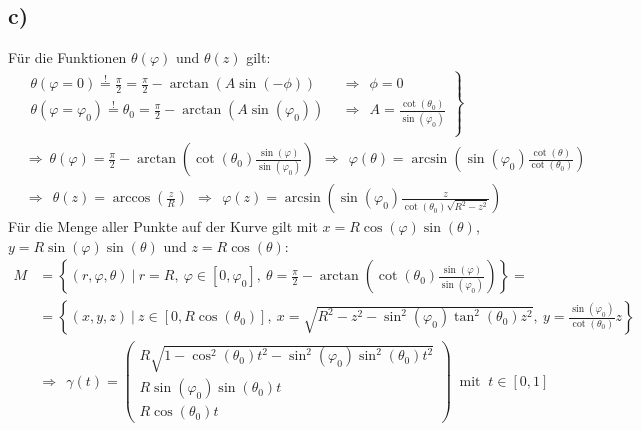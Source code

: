 \documentclass[a4paper,12pt]{article}
\begin{document}
\subsection*{c)}
Für die Funktionen $\theta(\varphi)$ und $\theta(z)$ gilt:
\begin{align*} &\left. \begin{array}{ll}
\theta(\varphi =0)\overset{!}{=}\frac{\pi}{2} = \frac{\pi}{2}-\arctan(A\sin(-\phi))\ \ &\Rightarrow\ \ \phi=0\\
\theta(\varphi =\varphi_0)\overset{!}{=}\theta_0 = \frac{\pi}{2}-\arctan(A\sin(\varphi_0)) \ \ &\Rightarrow\ \ A=\frac{\cot(\theta_0)}{\sin(\varphi_0)} \\ \end{array}\right\}\\
&\Rightarrow\ \theta(\varphi)=\frac{\pi}{2}-\arctan\left(\cot(\theta_0)\frac{\sin(\varphi)}{\sin(\varphi_0)}\right)\ \ \Rightarrow\ \ \varphi(\theta) = \arcsin\left( \sin(\varphi_0)\frac{\cot(\theta)}{\cot(\theta_0)} \right)\\
&\Rightarrow\ \ \theta(z)=\arccos\left(\frac{z}{R}\right)\ \ \Rightarrow\ \ \varphi(z)=\arcsin\left(\sin(\varphi_0)\frac{z}{\cot(\theta_0)\sqrt{R^2-z^2}}\right)
\end{align*}
Für die Menge aller Punkte auf der Kurve gilt mit $x=R\cos(\varphi)\sin(\theta)$, $y=R\sin(\varphi)\sin(\theta)$ und $z=R\cos(\theta)$:
\begin{align*}
M&=\left\{ (r,\varphi, \theta)\ \bigg\vert\ r=R, \ \varphi\in [0, \varphi_0], \ \theta = \frac{\pi}{2}-\arctan\left( \cot(\theta_0)\frac{\sin(\varphi)}{\sin(\varphi_0)} \right) \right\}=\\
&=\left\{ (x,y,z)\ \bigg\vert\ z\in [0, R\cos(\theta_0)], \ x=\sqrt{R^2-z^2-\sin^2(\varphi_0)\tan^2(\theta_0)z^2}, \ y = \frac{\sin(\varphi_0)}{\cot(\theta_0)}z \right\}\\
&\Rightarrow\ \ \gamma(t)=\begin{pmatrix} R\sqrt{1-\cos^2(\theta_0)t^2-\sin^2(\varphi_0)\sin^2(\theta_0)t^2} \\ R\sin(\varphi_0)\sin(\theta_0)t \\ R\cos(\theta_0)t \end{pmatrix}\ \textrm{ mit }\ t\in [0,1]
\end{align*}
\end{document}
